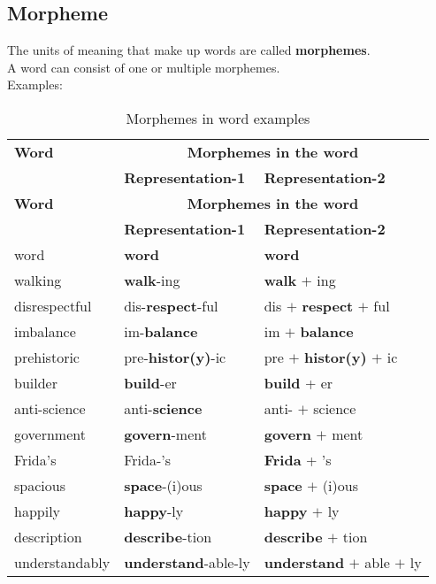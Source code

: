 \subsection{Morpheme}\label{Language: Morpheme}
The units of meaning that make up words are called \textbf{morphemes}.\\
A word can consist of one or multiple morphemes.\\
Examples:
\begin{longtable}[H]{l l l}
    \caption{Morphemes in word examples}\\
    \hline

    \textbf{Word} & \multicolumn{2}{c}{\textbf{Morphemes in the word}} \\ 
    & \textbf{Representation-1} & \textbf{Representation-2} \\ \hline
    \endfirsthead
    
    \textbf{Word} & \multicolumn{2}{c}{\textbf{Morphemes in the word}} \\ 
    & \textbf{Representation-1} & \textbf{Representation-2} \\ \hline
    \endhead
    
    \hline
    \endfoot

    \hline
    \endlastfoot
    
    word & \textbf{word} & \textbf{word} \\
    walking & \textbf{walk}-ing & \textbf{walk} $+$ ing \\
    disrespectful & dis-\textbf{respect}-ful & dis $+$ \textbf{respect} $+$ ful \\ 
    \hline
    imbalance & im-\textbf{balance} &  im $+$ \textbf{balance} \\
    prehistoric & pre-\textbf{histor(y)}-ic &  pre $+$ \textbf{histor(y)} $+$ ic \\
    builder & \textbf{build}-er & \textbf{build} + er \\
    anti-science & anti-\textbf{science} & anti- $+$ science \\
    government & \textbf{govern}-ment & \textbf{govern} $+$ ment \\
    Frida's & Frida-'s & \textbf{Frida} + 's \\
    \hline
    spacious & \textbf{space}-(i)ous & \textbf{space} $+$ (i)ous \\
    happily & \textbf{happy}-ly & \textbf{happy} $+$ ly \\
    description & \textbf{describe}-tion & \textbf{describe} $+$ tion \\
    understandably & \textbf{understand}-able-ly & \textbf{understand} $+$ able $+$ ly \\
    
    
\end{longtable}

